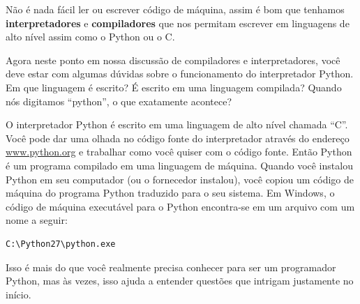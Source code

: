 Não é nada fácil ler ou escrever código de máquina, assim é bom que tenhamos
{\bf interpretadores} e {\bf compiladores} que nos permitam escrever em linguagens
de alto nível assim como o Python ou o C.
%

Agora neste ponto em nossa discussão de compiladores e interpretadores, você deve
estar com algumas dúvidas sobre o funcionamento do interpretador Python. Em que
linguagem é escrito? É escrito em uma linguagem compilada? Quando nós
digitamos ``python'', o que exatamente acontece?
%

O interpretador Python é escrito em uma linguagem de alto nível chamada ``C''.
Você pode dar uma olhada no código fonte do interpretador através
do endereço \url{www.python.org} e trabalhar como você quiser com o código fonte.
Então Python é um programa compilado em uma linguagem de máquina.
Quando você instalou Python em seu computador (ou o fornecedor instalou),
você copiou um código de máquina do programa Python traduzido para o seu sistema.
Em Windows, o código de máquina executável para o Python encontra-se em um
arquivo com um nome a seguir:
%

\beforeverb
\begin{verbatim}
C:\Python27\python.exe
\end{verbatim}
\afterverb

Isso é mais do que você realmente precisa conhecer para ser um programador Python, mas
às vezes, isso ajuda a entender questões que intrigam justamente no início.
%

